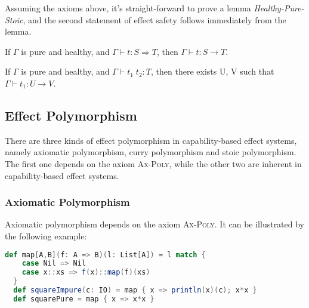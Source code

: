Assuming the axioms above, it's straight-forward to prove a lemma
\emph{Healthy-Pure-Stoic}, and the second statement of effect safety
follows immediately from the lemma.

\begin{lemma}
  If $\Gamma$ is pure and healthy,  and $\Gamma \vdash t : S
  \Rightarrow T$, then $\Gamma \vdash t : S \to T$.
\end{lemma}

\begin{theorem}
  If $\Gamma$ is pure and healthy, and $\Gamma \vdash t_1 \; t_2 : T$,
  then there exists U, V such that $\Gamma \vdash t_1 : U \to V$.
\end{theorem}


\subsection{Effect Polymorphism}

\label{sec:effect-polymorphism}

There are three kinds of effect polymorphism in capability-based
effect systems, namely axiomatic polymorphism, curry polymorphism and
stoic polymorphism. The first one depends on the axiom
\textsc{Ax-Poly}, while the other two are inherent in capability-based
effect systems.

\subsubsection{Axiomatic Polymorphism}

Axiomatic polymorphism depends on the axiom \textsc{Ax-Poly}. It can
be illustrated by the following example:

\begin{lstlisting}[language=Scala]
  def map[A,B](f: A => B)(l: List[A]) = l match {
    case Nil => Nil
    case x::xs => f(x)::map(f)(xs)
  }
  def squareImpure(c: IO) = map { x => println(x)(c); x*x }
  def squarePure = map { x => x*x }
\end{lstlisting}

